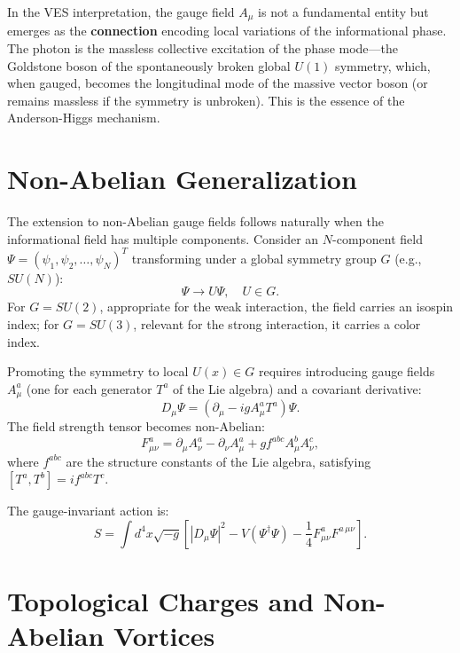 \documentclass[12pt,a4paper]{book}
\begin{document}
In the VES interpretation, the gauge field $A_\mu$ is not a fundamental entity but emerges as the \textbf{connection} encoding local variations of the informational phase. The photon is the massless collective excitation of the phase mode—the Goldstone boson of the spontaneously broken global $U(1)$ symmetry, which, when gauged, becomes the longitudinal mode of the massive vector boson (or remains massless if the symmetry is unbroken). This is the essence of the Anderson-Higgs mechanism.

\section{Non-Abelian Generalization}

The extension to non-Abelian gauge fields follows naturally when the informational field has multiple components. Consider an $N$-component field $\Psi = (\psi_1, \psi_2, \ldots, \psi_N)^T$ transforming under a global symmetry group $G$ (e.g., $SU(N)$):
\begin{equation}
    \Psi \rightarrow U \Psi, \quad U \in G.
\end{equation}
For $G = SU(2)$, appropriate for the weak interaction, the field carries an isospin index; for $G = SU(3)$, relevant for the strong interaction, it carries a color index.

Promoting the symmetry to local $U(x) \in G$ requires introducing gauge fields $A_\mu^a$ (one for each generator $T^a$ of the Lie algebra) and a covariant derivative:
\begin{equation}
    D_\mu \Psi = (\partial_\mu - i g A_\mu^a T^a) \Psi.
\end{equation}
The field strength tensor becomes non-Abelian:
\begin{equation}
    F_{\mu\nu}^a = \partial_\mu A_\nu^a - \partial_\nu A_\mu^a + g f^{abc} A_\mu^b A_\nu^c,
\end{equation}
where $f^{abc}$ are the structure constants of the Lie algebra, satisfying $[T^a, T^b] = i f^{abc} T^c$.

The gauge-invariant action is:
\begin{equation}
    S = \int d^4x \sqrt{-g} \left[ |D_\mu \Psi|^2 - V(\Psi^\dagger \Psi) - \frac{1}{4} F_{\mu\nu}^a F^{a\,\mu\nu} \right].
\end{equation}

\section{Topological Charges and Non-Abelian Vortices}
\end{document}
